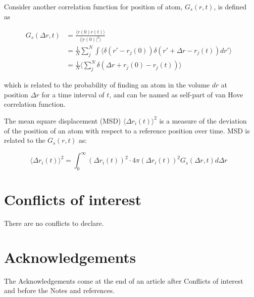 \documentclass[twoside,twocolumn,9pt]{article}
\renewcommand{\refname}{Notes and references}
\begin{document}
Consider another correlation function for position of atom, $G_s(r,t)$, is defined as

\begin{align*}
G_s(\Delta r,t)&=\frac{\langle r(0)r(t)\rangle}{\langle | r(0)|^2 \rangle} \\
        &=\frac{1}{N}\sum_{j}^{N}\int \langle \delta(r'-r_j(0))\delta(r'+\Delta r -r_j(t))dr' \rangle \\
        &=\frac{1}{N}\langle \sum_{j}^{N}\delta(\Delta r +r_j(0)-r_j(t))\rangle
\end{align*}

which is related to the probability of finding an atom in the volume $dr$ at position $\Delta r$ for a time interval of $t$,
and can be named as self-part of van Hove correlation function.

The mean square displacement (MSD) $\langle \Delta r_i(t)\rangle ^2$  is a measure of the deviation of the position of an atom with
respect to a reference position over time. MSD is related to the $G_s(r,t)$ as:

\begin{equation}
  \langle \Delta r_i(t)\rangle ^2=\int_{0}^{\infty} (\Delta r_i(t))^2\cdot 4\pi(\Delta r_i(t))^2G_s(\Delta r,t)d\Delta r
\end{equation}



\section*{Conflicts of interest}
There are no conflicts to declare.

\section*{Acknowledgements}
The Acknowledgements come at the end of an article after Conflicts of interest and before the Notes and references.



\balance


\end{document}
